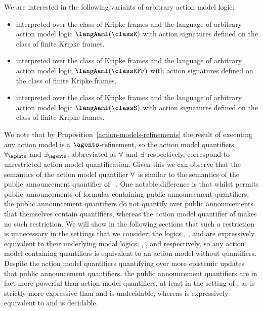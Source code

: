 \pagebreak

We are interested in the following variants of arbitrary action model logic:
\begin{itemize}
    \item \logicAamlK{} interpreted over the class of \classK{} Kripke frames and the language of arbitrary action model logic $\langAaml(\classK)$ with action signatures defined on the class of finite \classK{} Kripke frames.
    \item \logicAamlKFF{} interpreted over the class of \classKFF{} Kripke frames and the language of arbitrary action model logic $\langAaml(\classKFF)$ with action signatures defined on the class of finite \classKFF{} Kripke frames.
    \item \logicAamlS{} interpreted over the class of \classS{} Kripke frames and the language of arbitrary action model logic $\langAaml(\classS)$ with action signatures defined on the class of finite \classS{} Kripke frames.
\end{itemize}

We note that by Proposition~\ref{action-models-refinements} the result of executing any action model is a $\agents$-refinement, so the action model quantifiers $\allactsAs$ and $\someactsAs$, abbreviated as $\allacts$ and $\someacts$ respectively, correspond to unrestricted action model quantification.
Given this we can observe that the semantics of the action model quantifier $\allacts$ is similar to the semantics of the public announcement quantifier of \logicApal{}~\cite{balbiani:2007}.
One notable difference is that whilst \logicApal{} permits public announcements of formulas containing public announcement quantifiers, the public announcement quantifiers do not quantify over public announcements that themselves contain quantifiers, whereas the action model quantifier of \logicAaml{} makes no such restriction.
We will show in the following sections that such a restriction is unnecessary in the settings that we consider; the logics \logicAamlK{}, \logicAamlKFF{}, and \logicAamlS{} are expressively equivalent to their underlying modal logics, \logicK{}, \logicKFF{}, and \logicS{} respectively, so any action model containing quantifiers is equivalent to an action model without quantifiers.
Despite the action model quantifiers quantifying over more epistemic updates that public announcement quantifiers, the public announcement quantifiers are in fact more powerful than action model quantifiers, at least in the setting of \classS{}, as \logicApalS{} is strictly more expressive than \logicS{} and is undecidable, whereas \logicAamlS{} is expressively equivalent to \logicS{} and is decidable.

